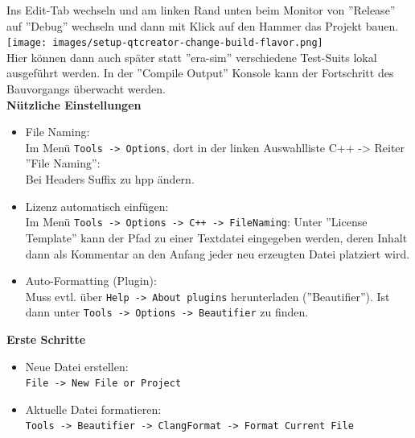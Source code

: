 Ins Edit-Tab wechseln und am linken Rand unten beim Monitor von ''Release'' auf ''Debug'' wechseln und dann mit Klick auf den Hammer das Projekt bauen.\\
\texttt{[image: images/setup-qtcreator-change-build-flavor.png]}\\
Hier können dann auch später statt ''era-sim'' verschiedene Test-Suits lokal ausgeführt werden. In der ''Compile Output'' Konsole kann der Fortschritt des Bauvorgangs überwacht werden.\\


\textbf{Nützliche Einstellungen}\\
\begin{itemize}
	\item File Naming:\\
	Im Menü \texttt{Tools -> Options}, dort in der linken Auswahlliste C++ -> Reiter ''File Naming'':\\
	Bei Headers Suffix zu hpp ändern.
	\item Lizenz automatisch einfügen:\\
	Im Menü \texttt{Tools -> Options -> C++ -> FileNaming}: Unter ''License Template'' kann der Pfad zu einer Textdatei eingegeben werden, deren Inhalt dann als Kommentar an den Anfang jeder neu erzeugten Datei platziert wird.
	\item Auto-Formatting (Plugin):\\
	 Muss evtl. über \texttt{Help -> About plugins} herunterladen (''Beautifier''). Ist dann unter \texttt{Tools -> Options -> Beautifier} zu finden.
\end{itemize}

\textbf{Erste Schritte}\\
\begin{itemize}
	\item Neue Datei erstellen:\\
	\texttt{File -> New File or Project}
	\item Aktuelle Datei formatieren:\\
	\texttt{Tools -> Beautifier -> ClangFormat -> Format Current File}
\end{itemize}

